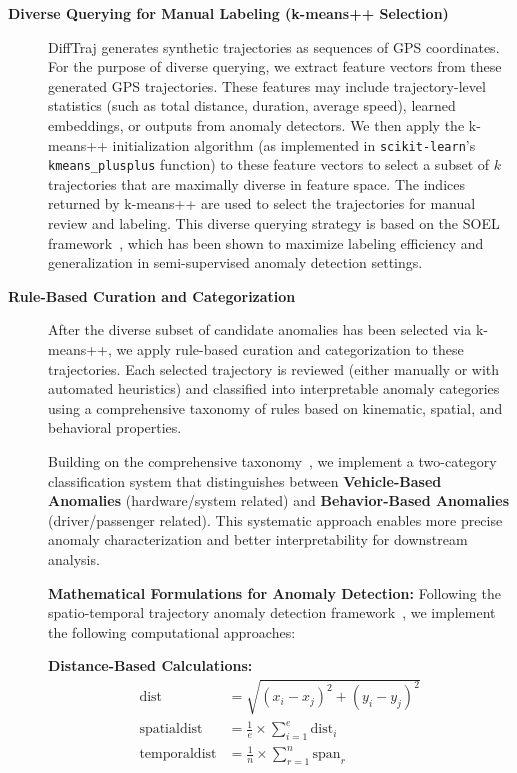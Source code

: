 \begin{description}
  \item[\textbf{Diverse Querying for Manual Labeling (k-means++ Selection)}] DiffTraj generates synthetic trajectories as sequences of GPS coordinates. For the purpose of diverse querying, we extract feature vectors from these generated GPS trajectories. These features may include trajectory-level statistics (such as total distance, duration, average speed), learned embeddings, or outputs from anomaly detectors. We then apply the k-means++ initialization algorithm (as implemented in \texttt{scikit-learn}'s \texttt{kmeans\_plusplus} function) to these feature vectors to select a subset of $k$ trajectories that are maximally diverse in feature space. The indices returned by k-means++ are used to select the trajectories for manual review and labeling. This diverse querying strategy is based on the SOEL framework~\cite{liDeepAnomalyDetection2023}, which has been shown to maximize labeling efficiency and generalization in semi-supervised anomaly detection settings.

  \item[\textbf{Rule-Based Curation and Categorization}] After the diverse subset of candidate anomalies has been selected via k-means++, we apply rule-based curation and categorization to these trajectories. Each selected trajectory is reviewed (either manually or with automated heuristics) and classified into interpretable anomaly categories using a comprehensive taxonomy of rules based on kinematic, spatial, and behavioral properties.

    Building on the comprehensive taxonomy~\cite{kongMobileTrajectoryAnomaly2024}, we implement a two-category classification system that distinguishes between \textbf{Vehicle-Based Anomalies} (hardware/system related) and \textbf{Behavior-Based Anomalies} (driver/passenger related). This systematic approach enables more precise anomaly characterization and better interpretability for downstream analysis.

    \textbf{Mathematical Formulations for Anomaly Detection:} Following the spatio-temporal trajectory anomaly detection framework~\cite{heEnhancedDBSCANMultiple2020}, we implement the following computational approaches:

    \textbf{Distance-Based Calculations:}
    \begin{align}
      \text{dist}         & = \sqrt{(x_i - x_j)^2 + (y_i - y_j)^2} \label{eq:euclidean}           \\
      \text{spatialdist}  & = \frac{1}{e} \times \sum_{i=1}^{e} \text{dist}_i \label{eq:spatial}  \\
      \text{temporaldist} & = \frac{1}{n} \times \sum_{r=1}^{n} \text{span}_r \label{eq:temporal}
    \end{align}


\end{description}

